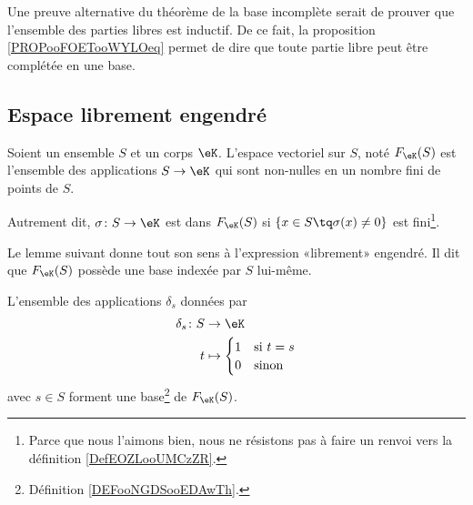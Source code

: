 \begin{normaltext}        \label{NORMooREVQooEFJWta}
	Une preuve alternative du théorème de la base incomplète serait de prouver que l'ensemble des parties libres est inductif. De ce fait, la proposition \ref{PROPooFOETooWYLOeq} permet de dire que toute partie libre peut être complétée en une base.
\end{normaltext}

\subsection{Espace librement engendré}

\begin{definition}       \label{DEFooCPNIooNxsYMY}
	Soient un ensemble \( S\) et un corps \(\eK \). L'espace vectoriel  sur \( S\), noté \( F_{\eK}(S)\) est l'ensemble des applications \( S\to \eK\) qui sont non-nulles en un nombre fini de points de \( S\).

	Autrement dit, \( \sigma\colon S\to \eK\) est dans \( F_{\eK}(S) \) si \( \{ x\in S\tq \sigma(x)\neq 0 \}\) est fini\footnote{Parce que nous l'aimons bien, nous ne résistons pas à faire un renvoi vers la définition \ref{DefEOZLooUMCzZR}.}.
\end{definition}

Le lemme suivant donne tout son sens à l'expression «librement» engendré. Il dit que \( F_{\eK}(S)\) possède une base indexée par \( S\) lui-même.
\begin{lemma}       \label{LEMooLOPAooUNQVku}
	L'ensemble des applications \( \delta_s\) données par
	\begin{equation}
		\begin{aligned}
			\delta_s\colon S & \to \eK                    \\
			t                & \mapsto \begin{cases}
				                           1 & \text{si } t=s \\
				                           0 & \text{sinon }
			                           \end{cases}
		\end{aligned}
	\end{equation}
	avec \( s\in S\) forment une base\footnote{Définition \ref{DEFooNGDSooEDAwTh}.} de \( F_{\eK}(S)\).
\end{lemma}

